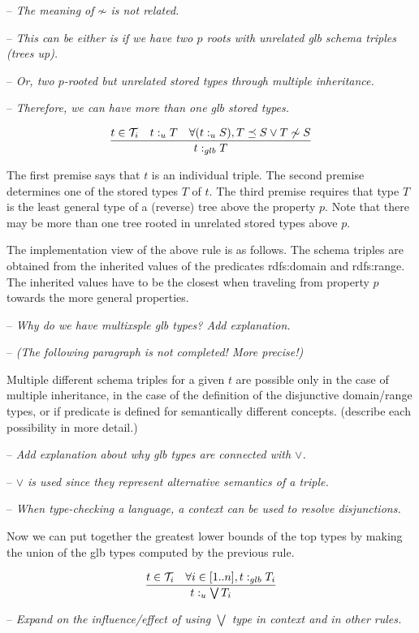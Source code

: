 \documentclass[runningheads]{llncs}
\newcommand{\Ti}{{\cal T}_i}
\newcommand{\notes}[1]{\noindent\begin{small}-- \emph{#1}\\\end{small}}
\begin{document}
\notes{The meaning of $\not\sim$ is \emph{not related}.}
\notes{This can be either is if we have two $p$ roots with unrelated glb schema triples (trees up).}
\notes{Or, two $p$-rooted but unrelated stored types through multiple inheritance.}
\notes{Therefore, we can have more than one glb stored types.}

\begin{equation}
\dfrac{t\in\Ti\quad t:_u\/T\quad \forall(t:_u\/S), T\preceq\/S\lor\/T\not\sim\/S}
      {t:_{glb}\/T}
\end{equation}

The first premise says that $t$ is an individual triple. The second
premise determines one of the stored types $T$ of $t$. The third
premise requires that type $T$ is the least general type of a
(reverse) tree above the property $p$. Note that there may be more
than one tree rooted in unrelated stored types above $p$.

The implementation view of the above rule is as follows. The schema
triples are obtained from the inherited values of the predicates
rdfs:domain and rdfs:range. The inherited values have to be the
closest when traveling from property $p$ towards the more general
properties.

\medskip
\notes{Why do we have multixsple glb types? Add explanation.}
\notes{(The following paragraph is not completed! More precise!)}

Multiple different schema triples for a given $t$ are possible only in
the case of multiple inheritance, in the case of the definition of the
disjunctive domain/range types, or if predicate is defined for
semantically different concepts. (describe each possibility in more
detail.)

\notes{Add explanation about why glb types are connected with $\lor$.}
\notes{$\lor$ is used since they represent alternative semantics of a triple.}
\notes{When type-checking a language, a context can be used to resolve disjunctions.}

Now we can put together the greatest lower bounds of the top types by
making the union of the glb types computed by the previous rule.

\begin{equation}
\dfrac{t\in\Ti\quad \forall\/i\in[1..n], t:_{glb}\/T_i}
      {t:_u\bigvee\/T_i}
\end{equation}

\notes{Expand on the influence/effect of using $\bigvee$ type in context and in other rules.}
\end{document}
